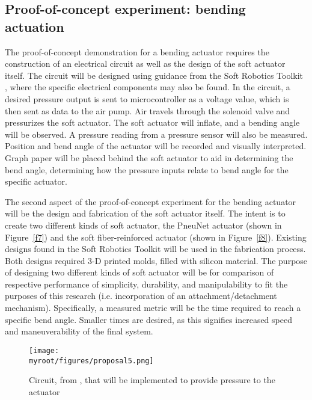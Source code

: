 \documentclass{IEEEtran}
\newcommand{\myroot}{../}
\begin{document}
\subsection{Proof-of-concept experiment: bending actuation}
The proof-of-concept demonstration for a bending actuator requires the construction of an electrical circuit as well as the design of the soft actuator itself.  The circuit will be designed using guidance from the Soft Robotics Toolkit \cite{holland2014soft}, where the specific electrical components may also be found.  In the circuit, a desired pressure output is sent to microcontroller as a voltage value, which is then sent as data to the air pump.  Air travels through the solenoid valve and pressurizes the soft actuator.  The soft actuator will inflate, and a bending angle will be observed. A pressure reading from a pressure sensor will also be measured.  Position and bend angle of the actuator will be recorded and visually interpreted.  Graph paper will be placed behind the soft actuator to aid in determining the bend angle, determining how the pressure inputs relate to bend angle for the specific actuator.
	
The second aspect of the proof-of-concept experiment for the bending actuator will be the design and fabrication of the soft actuator itself.  The intent is to create two different kinds of soft actuator, the PneuNet actuator (shown in Figure~\ref{f7}) and the soft fiber-reinforced actuator (shown in Figure~\ref{f8}).  Existing designs found in the Soft Robotics Toolkit \cite{holland2014soft} will be used in the fabrication process.  Both designs required 3-D printed molds, filled with silicon material.  The purpose of designing two different kinds of soft actuator will be for comparison of respective performance of simplicity, durability, and manipulability to fit the purposes of this research (i.e. incorporation of an attachment/detachment mechanism).  Specifically, a measured metric will be the time required to reach a specific bend angle. Smaller times are desired, as this signifies increased speed and maneuverability of the final system.   

\begin{figure}
\begin{center}
\texttt{[image: \\myroot/figures/proposal5.png]}
\end{center}
\caption{Circuit, from \cite{holland2014soft}, that will be implemented to provide pressure to the actuator}
\label{f5}
\end{figure}
\end{document}
